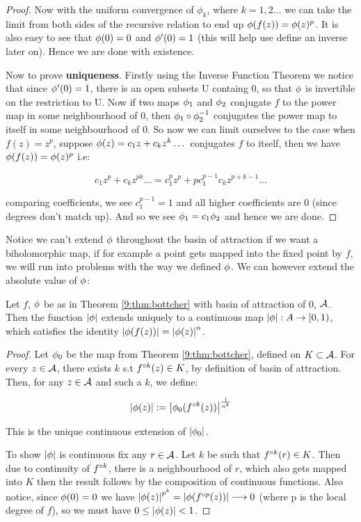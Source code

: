 \documentclass[../main.tex]{subfiles}
\begin{document}
\begin{proof}
Now with the uniform convergence of $\phi_k$, where $k=1,2\dots$ we can take the limit from both sides of the recursive relation to end up $\phi(f(z)) = \phi(z)^p$. It is also easy to see that $\phi(0) = 0$ and $\phi'(0) = 1$ (this will help use define an inverse later on). Hence we are done with existence. 


 Now to prove \textbf{uniqueness}. Firstly using the Inverse Function Theorem we notice that since $\phi'(0) = 1$, there is an open subsets U containg 0, so that $\phi$ is invertible on the restriction to U. Now if two maps $\phi_1$ and $\phi_2$ conjugate $f$ to the power map in some neighbourhood of 0, then $\phi_1 \circ \phi_2^{-1}$ conjugates the power map to itself in some neighbourhood of 0. So now we can limit ourselves to the case when $f(z)=z^p$, suppose $\phi(z) = c_1z + c_kz^k\dots$ conjugates $f$ to itself, then we have $\phi(f(z)) = \phi(z)^p$ i.e:

$$c_1z^p + c_kz^{pk} \dots = c_1^pz^p + pc_1^{p-1}c_kz^{p+k-1}\dots$$

comparing coefficients, we see $c_1^{p-1} =1$ and all higher coefficients are 0 (since degrees don't match up). And so we see $\phi_1 = c_1\phi_2$ and hence we are done.   


\end{proof}


Notice we can't extend $\phi$ throughout the basin of attraction if we want a biholomorphic map, if for example a point gets mapped into the fixed point by $f$, we will run into problems with the way we defined $\phi$. We can however extend the absolute value of $\phi$:

\begin{thm}
\label{9:thm:absval}
Let $f$, $\phi$ be as in Theorem \ref{9:thm:bottcher} with basin of attraction of 0, $\mathcal{A}$. Then the function $\left|\phi\right|$ extends uniquely to a continuous map $\left|\phi\right| : A \to [0,1)$, which satisfies the identity $\left|\phi(f(z))\right| = {\left|\phi(z)\right|}^{n}$.
\end{thm}

\begin{proof}
Let $\phi_0$ be the map from Theorem \ref{9:thm:bottcher}, defined on $K \subset \mathcal{A}$. For every $z \in \mathcal{A}$, there exists $k$ s.t $f^{\circ k}(z) \in K$, by definition of basin of attraction. Then, for any $z \in \mathcal{A}$ and such a $k$, we define:

$$\left|\phi(z)\right| := \left|\phi_0(f^{\circ k}(z))\right|^\frac{1}{n^k}$$

This is the unique continuous extension of $\left|\phi_0\right|$. 

To show $\left|\phi\right|$ is continuous fix any $r\in \mathcal{A}$. Let $k$ be such that $f^{\circ k}(r)\in K$. Then due to continuity of $f^{\circ k}$, there is a neighbourhood of $r$, which also gets mapped into $K$ then the result follows by the composition of continuous functions. Also notice, since $\phi(0)=0$ we have $\left|\phi(z)\right|^{p^{k}} = \left|\phi(f^{\circ p}(z))\right|\longrightarrow 0$ (where p is the local degree of $f$), so we must have $0\leq\left|\phi(z)\right|<1$.
\end{proof}
\end{document}
